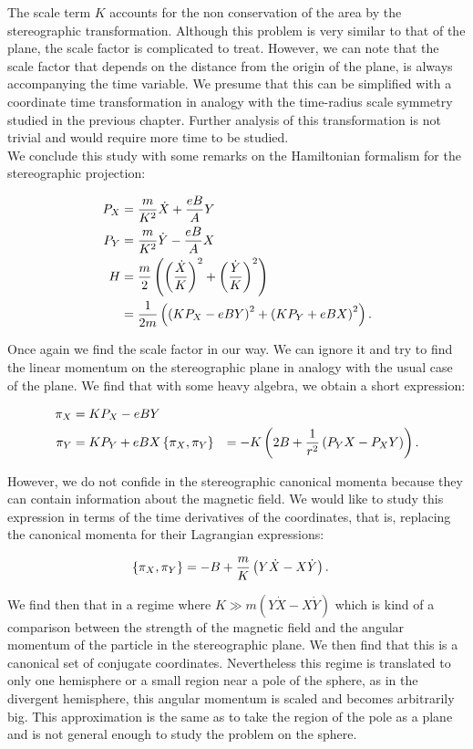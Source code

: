 The scale term $K$ accounts for the non conservation of the area by the stereographic transformation. Although this problem is very similar to that of the plane, the scale factor is complicated to treat. However, we can note that the scale factor that depends on the distance from the origin of the plane, is always accompanying the time variable. We presume that this can be simplified with a coordinate time transformation in analogy with the time-radius scale symmetry studied in the previous chapter. Further analysis of this transformation is not trivial and would require more time to be studied.\\

We conclude this study with some remarks on the Hamiltonian formalism for the stereographic projection:

\begin{align*}
P_X &= \frac{m}{K^2}\dot{X} + \frac{eB}{A}Y\\
P_Y &= \frac{m}{K^2}\dot{Y} - \frac{eB}{A}X\\
H &= \frac{m}{2}\left( \left( \frac{\dot{X}}{K} \right)^2+\left( \frac{\dot{Y}}{K} \right)^2 \right)\\
&= \frac{1}{2m}\left( \left( KP_X-eBY \right)^2+\left( KP_Y+eBX \right)^2 \right).
\end{align*}

Once again we find the scale factor in our way. We can ignore it and try to find the linear momentum on the stereographic plane in analogy with the usual case of the plane. We find that with some heavy algebra, we obtain a short expression:

\begin{align*}
\pi_X &= KP_X-eBY\\
\pi_Y &= KP_Y+eBX
\left\lbrace \pi_X, \pi_Y \right\rbrace &= -K\left( 2B + \frac{1}{r^2}\left( P_YX-P_XY \right) \right).
\end{align*}

However, we do not confide in the stereographic canonical momenta because they can contain information about the magnetic field. We would like to study this expression in terms of the time derivatives of the coordinates, that is, replacing the canonical momenta for their Lagrangian expressions:

\begin{align*}
\left\lbrace \pi_X, \pi_Y \right\rbrace &= -B + \frac{m}{K}\left( Y\dot{X}-X\dot{Y} \right).
\end{align*}

We find then that in a regime where $K \gg  m(Y\dot{X}-X\dot{Y})$ which is kind of a comparison between the strength of the magnetic field and the angular momentum of the particle in the stereographic plane. We then find that this is a canonical set of conjugate coordinates. Nevertheless this regime is translated to only one hemisphere or a small region near a pole of the sphere, as in the divergent hemisphere, this angular momentum is scaled and becomes arbitrarily big. This approximation is the same as to take the region of the pole as a plane and is not general enough to study the problem on the sphere.\\

